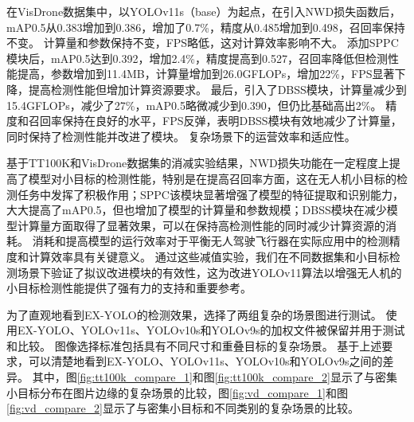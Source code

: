 在VisDrone数据集中，以YOLOv11s（base）为起点，在引入NWD损失函数后，mAP0.5从0.383增加到0.386，增加了0.7\%，精度从0.485增加到0.498，召回率保持不变。 计算量和参数保持不变，FPS略低，这对计算效率影响不大。 添加SPPC模块后，mAP0.5达到0.392，增加2.4\%，精度提高到0.527，召回率降低但检测性能提高，参数增加到11.4MB，计算量增加到26.0GFLOPs，增加22\%，FPS显著下降，提高检测性能但增加计算资源要求。 最后，引入了DBSS模块，计算量减少到15.4GFLOPs，减少了27\%，mAP0.5略微减少到0.390，但仍比基础高出2\%。 精度和召回率保持在良好的水平，FPS反弹，表明DBSS模块有效地减少了计算量，同时保持了检测性能并改进了模块。 复杂场景下的运营效率和适应性。

基于TT100K和VisDrone数据集的消减实验结果，NWD损失功能在一定程度上提高了模型对小目标的检测性能，特别是在提高召回率方面，这在无人机小目标的检测任务中发挥了积极作用；SPPC该模块显著增强了模型的特征提取和识别能力，大大提高了mAP0.5，但也增加了模型的计算量和参数规模；DBSS模块在减少模型计算量方面取得了显著效果，可以在保持高检测性能的同时减少计算资源的消耗。 消耗和提高模型的运行效率对于平衡无人驾驶飞行器在实际应用中的检测精度和计算效率具有关键意义。 通过这些减值实验，我们在不同数据集和小目标检测场景下验证了拟议改进模块的有效性，这为改进YOLOv11算法以增强无人机的小目标检测性能提供了强有力的支持和重要参考。

为了直观地看到EX-YOLO的检测效果，选择了两组复杂的场景图进行测试。 使用EX-YOLO、YOLOv11s、YOLOv10s和YOLOv9s的加权文件被保留并用于测试和比较。 图像选择标准包括具有不同尺寸和重叠目标的复杂场景。 基于上述要求，可以清楚地看到EX-YOLO、YOLOv11s、YOLOv10s和YOLOv9s之间的差异。 其中，图\ref{fig:tt100k_compare_1}和图\ref{fig:tt100k_compare_2}显示了与密集小目标分布在图片边缘的复杂场景的比较，图\ref{fig:vd_compare_1}和图\ref{fig:vd_compare_2}显示了与密集小目标和不同类别的复杂场景的比较。

